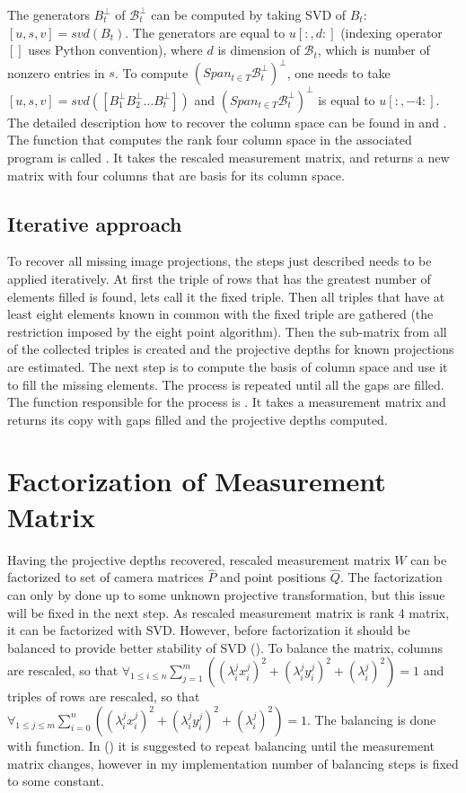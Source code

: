 \documentclass[12pt]{article}
\begin{document}
The generators $B_t^\bot$ of $\mathcal{B}_t^\bot$ can be computed by taking SVD
of $B_t$: $[u, s, v] = svd(B_t)$. The generators are equal to $u[:, d:]$
(indexing operator $[]$ uses Python convention), where $d$ is dimension of
$\mathcal{B}_t$, which is number of nonzero entries in $s$. To compute $(Span_{t
\in T} \mathcal{B}_t^\bot)^\bot$, one needs to take $[u, s, v] = svd([B_1^\bot
B_2^\bot \dots B_t^\bot])$ and $(Span_{t \in T} \mathcal{B}_t^\bot)^\bot$ is
equal to $u[:, -4:]$. The detailed description how to recover the column space
can be found in \cite{jacobs99} and \cite{svoboda04}. The function that computes
the rank four column space in the associated program is called
. It takes the rescaled measurement matrix, and
returns a new matrix with four columns that are basis for its column space.

\subsection{Iterative approach}

To recover all missing image projections, the
steps just described needs to be applied iteratively. At first the triple of
rows that has the greatest number of elements filled is found, lets call it the
fixed triple. Then all triples that have at least eight elements known in common
with the fixed triple are gathered (the restriction imposed by the eight point
algorithm). Then the sub-matrix from all of the collected triples is created and
the projective depths for known projections are estimated. The next step is to
compute the basis of column space and use it to fill the missing elements. The
process is repeated until all the gaps are filled. The function responsible for
the process is . It takes a measurement matrix
 and returns its copy with gaps filled and the projective depths
computed.

\section{Factorization of Measurement Matrix}

Having the projective depths
recovered, rescaled measurement matrix $W$ can be factorized to set of camera
matrices $\hat{P}$ and point positions $\hat{Q}$. The factorization can only by
done up to some unknown projective transformation, but this issue will be fixed
in the next step. As rescaled measurement matrix is rank 4 matrix, it can be
factorized with SVD. However, before factorization it should be balanced to
provide better stability of SVD (\cite{sturm96}). To balance the matrix, columns
are rescaled, so that $\forall_{1 \leq i \leq n} \sum_{j=1}^m \left( (\lambda
_i^j x_i^j)^2 + (\lambda _i^j y_i^j)^2 + (\lambda _i^j)^2 \right) = 1$ and
triples of rows are rescaled, so that $\forall_{1 \leq j \leq m} \sum_{i=0}^n
\left( (\lambda _i^j x_i^j)^2 + (\lambda _i^j y_i^j)^2 + (\lambda _i^j)^2
\right) = 1$. The balancing is done with 
function. In (\cite{sturm96}) it is suggested to repeat balancing until the
measurement matrix  changes, however in my implementation number of balancing
steps is fixed to some constant.
\end{document}
